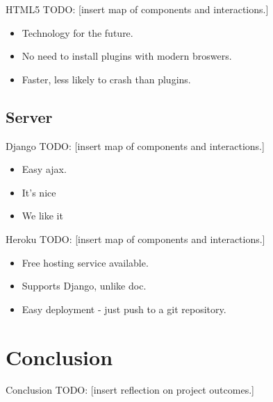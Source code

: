 \documentclass{beamer}
\begin{document}
\begin{frame}{HTML5}
  TODO:
  [insert map of components and interactions.]
  \begin{itemize}
    \item Technology for the future.
    \item No need to install plugins with modern broswers.
    \item Faster, less likely to crash than plugins.
  \end{itemize}
\end{frame}

\subsection{Server}

\begin{frame}{Django}
  TODO:
  [insert map of components and interactions.]
  \begin{itemize}
    \item Easy ajax.
    \item It's nice
    \item We like it
  \end{itemize}
\end{frame}

\begin{frame}{Heroku}
  TODO:
  [insert map of components and interactions.]
  \begin{itemize}
    \item Free hosting service available.
    \item Supports Django, unlike doc.
    \item Easy deployment - just push to a git repository.
  \end{itemize}
\end{frame}


\section{Conclusion}

\begin{frame}{Conclusion}
  TODO:
  [insert reflection on project outcomes.]
\end{frame}
\end{document}
